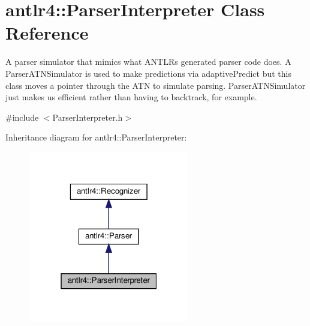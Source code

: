 \hypertarget{classantlr4_1_1ParserInterpreter}{}\section{antlr4\+:\+:Parser\+Interpreter Class Reference}
\label{classantlr4_1_1ParserInterpreter}


A parser simulator that mimics what A\+N\+T\+LR\textquotesingle{}s generated parser code does. A Parser\+A\+T\+N\+Simulator is used to make predictions via adaptive\+Predict but this class moves a pointer through the A\+TN to simulate parsing. Parser\+A\+T\+N\+Simulator just makes us efficient rather than having to backtrack, for example.  




{\ttfamily \#include $<$Parser\+Interpreter.\+h$>$}



Inheritance diagram for antlr4\+:\+:Parser\+Interpreter\+:
\nopagebreak
\begin{figure}[H]
\begin{center}
\leavevmode
\includegraphics[width=199pt]{classantlr4_1_1ParserInterpreter__inherit__graph}
\end{center}
\end{figure}


